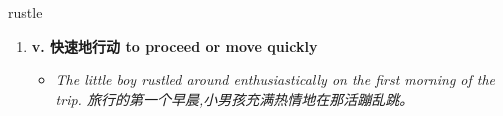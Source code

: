 
\begin{frame}
{\huge rustle}
\begin{center}
\begin{enumerate}\Large
  \item \textbf{v. 快速地行动 to proceed or move quickly}
  \begin{itemize}
    \item \em{\Large{The little boy rustled around enthusiastically on the first morning of the trip. 旅行的第一个早晨,小男孩充满热情地在那活蹦乱跳。}}
  \end{itemize}
\end{enumerate}
\end{center}
\end{frame}

